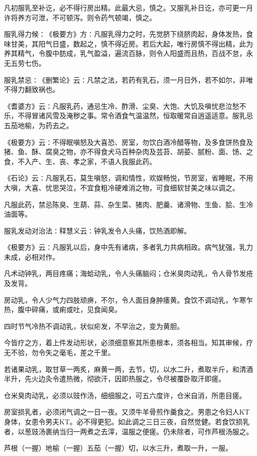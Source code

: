 \documentclass[a4paper,12pt,UTF8,twoside]{ctexbook}
\begin{document}
凡初服乳至补讫，必不得行房出精。此最大忌，慎之。又服乳补日讫，亦可更一月许将养方可泄，不可顿泻。则令药气顿竭，慎之。

服乳得力候∶《极要方》方∶凡服乳得力之时，先觉脐下绕脐肉起，身体发热，食味甘美，其阳气日盛，数起之，慎不得近房。若后大起，唯行房慎不得出精，此为养其精气，令腹中肪成，乳气盈溢，遍流百脉，则令人阳盛而且热，百战不怠，永无五劳七伤。

服乳禁忌∶《删繁论》云∶凡禁之法，若药有乳石，须一月日外，若不如尔，非唯不得力翻致祸也。

《耆婆方》云∶凡服乳药，通忌生冷、酢滑、尘臭、大饱、大饥及嗔忧悲泣愁不乐，不得冒诸风雪及淹秽之事。常令酒食气温温然，恒取暖常自逍遥适意。服乳忌五茄地榆，为药去之。

《极要方》云∶不得眠嗔怒及大喜恐、房室，勿饮白酒冷醋等物，及多食饼热食及猪、鱼、酥、腐臭之物，亦不得食犬马百种杂肉及芸苔、胡荽、腻粉、面、饧、之食，不入产、生、丧、孝之家，不语人我服此药。

《石论》云∶凡服乳石，莫生嗔怒，调和情性，欢娱畅悦，节房室，省睡眠，不用大嗔，大喜、忧思哭泣，不宜食粗冷硬难消之物，可食细软甘美之味以调之。

凡服此药，禁忌陈臭、生葫、蒜、杂生菜、猪肉、肥羹、诸滑物、生鱼、脍、生冷油面等。

服乳发动对治法∶释慧义云∶钟乳发令人头痛，饮热酒即解。

《极要方》云∶凡服乳以后，身中先有诸病，多者乳力共病相政。病气犹强，乳力未成，必相对作。

凡术动钟乳，两目疼痛；海蛤动乳，令人头痛脑闷；仓米臭肉动乳，令人骨节发疮及发背。

房动乳，令人少气力四肢顽痹，不尔，令人面目身肿痿黄。食饮不调动乳，乍寒乍热，腹中碎痛，或痢或吐，见食闻臭。

四时节气冷热不调动乳，状似疟发，不早治之，变为黄胆。

今皆疗之方，着上件发动形状，必须细意察其所患根本，须各相当。知其审候，疗无不验，勿令失之毫毛，差之千里。

若诸果动乳，取甘草一两炙，麻黄一两，去节，切，以水二升，煮取半斤，和清酒半升，先火边灸令遣热微，彻欲汗，因即热服之，令尽被覆卧取汗即瘥。

仓米臭肉动乳，必须以豉作汤，细细服之，可五六度许，仓米自消，所患目瘥。

房室损乳者，必须闭气调之一日一夜。又须牛羊骨煎作羹食之。男患之令妇人KT身体，女患令男夫KT。必不得更犯。如此调之三日三夜，自然觉健。若食饮损乳者，以葱豉汤裹纳当归一两煮之去滓，温服之便瘥。仍未除者，可作芦根汤服之。

芦根（一握）地榆（一握）五茄（一握）切，以水三升，煮取一升，一服。
\end{document}

